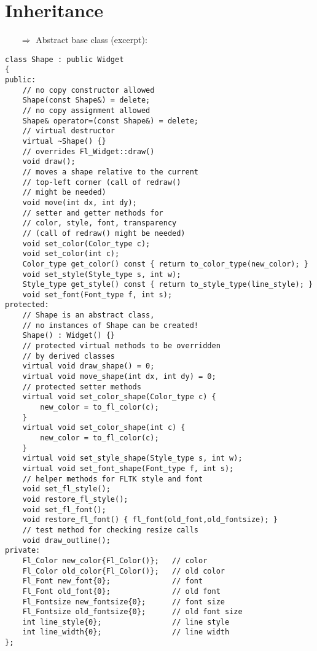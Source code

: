 \documentclass[10pt]{article}
\begin{document}
\section{Inheritance}
\small
\begin{enumerate}
\item[$\Rightarrow$] Abstract base class (excerpt):
\end{enumerate}
\begin{lstlisting}
class Shape : public Widget
{
public:
    // no copy constructor allowed
    Shape(const Shape&) = delete;
    // no copy assignment allowed
    Shape& operator=(const Shape&) = delete;
    // virtual destructor
    virtual ~Shape() {}
    // overrides Fl_Widget::draw()
    void draw();
    // moves a shape relative to the current
    // top-left corner (call of redraw()
    // might be needed)
    void move(int dx, int dy);
    // setter and getter methods for
    // color, style, font, transparency
    // (call of redraw() might be needed)
    void set_color(Color_type c);
    void set_color(int c);
    Color_type get_color() const { return to_color_type(new_color); }
    void set_style(Style_type s, int w);
    Style_type get_style() const { return to_style_type(line_style); }
    void set_font(Font_type f, int s);
protected:
    // Shape is an abstract class,
    // no instances of Shape can be created!
    Shape() : Widget() {}
    // protected virtual methods to be overridden
    // by derived classes
    virtual void draw_shape() = 0;
    virtual void move_shape(int dx, int dy) = 0;
    // protected setter methods
    virtual void set_color_shape(Color_type c) {
        new_color = to_fl_color(c);
    }
    virtual void set_color_shape(int c) {
        new_color = to_fl_color(c);
    }
    virtual void set_style_shape(Style_type s, int w);
    virtual void set_font_shape(Font_type f, int s);
    // helper methods for FLTK style and font
    void set_fl_style();
    void restore_fl_style();
    void set_fl_font();
    void restore_fl_font() { fl_font(old_font,old_fontsize); }
    // test method for checking resize calls
    void draw_outline();
private:
    Fl_Color new_color{Fl_Color()};   // color
    Fl_Color old_color{Fl_Color()};   // old color
    Fl_Font new_font{0};              // font
    Fl_Font old_font{0};              // old font
    Fl_Fontsize new_fontsize{0};      // font size
    Fl_Fontsize old_fontsize{0};      // old font size
    int line_style{0};                // line style
    int line_width{0};                // line width
};
\end{lstlisting}
\end{document}
